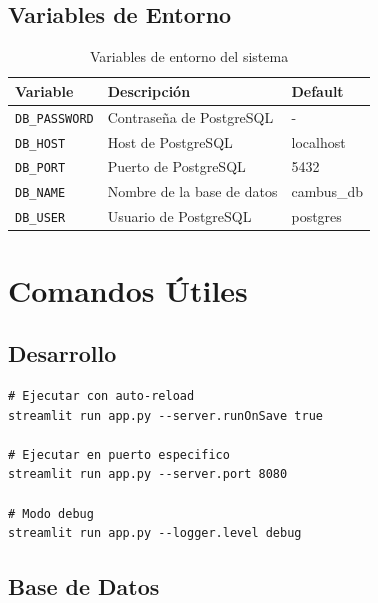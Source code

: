 \documentclass[12pt,a4paper]{article}
\begin{document}
\subsection{Variables de Entorno}

\begin{table}[H]
    \centering
    \begin{tabular}{|l|l|l|}
        \hline
        \textbf{Variable} & \textbf{Descripción} & \textbf{Default} \\
        \hline
        \texttt{DB\_PASSWORD} & Contraseña de PostgreSQL & - \\
        \hline
        \texttt{DB\_HOST} & Host de PostgreSQL & localhost \\
        \hline
        \texttt{DB\_PORT} & Puerto de PostgreSQL & 5432 \\
        \hline
        \texttt{DB\_NAME} & Nombre de la base de datos & cambus\_db \\
        \hline
        \texttt{DB\_USER} & Usuario de PostgreSQL & postgres \\
        \hline
    \end{tabular}
    \caption{Variables de entorno del sistema}
\end{table}

\section{Comandos Útiles}

\subsection{Desarrollo}

\begin{lstlisting}[style=bash]
# Ejecutar con auto-reload
streamlit run app.py --server.runOnSave true

# Ejecutar en puerto especifico
streamlit run app.py --server.port 8080

# Modo debug
streamlit run app.py --logger.level debug
\end{lstlisting}

\subsection{Base de Datos}
\end{document}
